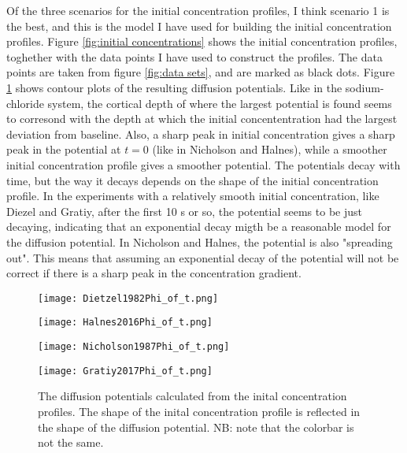 \documentclass{article}
\begin{document}
Of the three scenarios for the initial concentration profiles, I think scenario 1 is the best, and this is the model I have used for building the initial concentration profiles. Figure \ref{fig:initial concentrations} shows the initial concentration profiles, toghether with the data points I have used to construct the profiles. The data points are taken from figure \ref{fig:data sets}, and are marked as black dots. Figure \ref{fig:contours} shows contour plots of the resulting diffusion potentials. Like in the sodium-chloride system, the cortical depth of where the largest potential is found seems to corresond with the depth at which the initial concententration had the largest deviation from baseline. Also, a sharp peak in initial concentration gives a sharp peak in the potential at $t=0$ (like in Nicholson and Halnes), while a smoother initial concentration profile gives a smoother potential. The potentials decay with time, but the way it decays depends on the shape of the initial concentration profile. In the experiments with a relatively smooth initial concentration, like Diezel and Gratiy, after the first 10 s or so, the potential seems to be just decaying, indicating that an exponential decay migth be a reasonable model for the diffusion potential. In Nicholson and Halnes, the potential is also "spreading out". This means that assuming an exponential decay of the potential will not be correct if there is a sharp peak in the concentration gradient. 

\begin{figure}[!tbp]
  \centering
  \begin{minipage}[b]{0.45\textwidth}
    \texttt{[image: Dietzel1982Phi\_of\_t.png]}
  \end{minipage}
  \hfill
  \begin{minipage}[b]{0.45\textwidth}
    \texttt{[image: Halnes2016Phi\_of\_t.png]}
  \end{minipage}
    \begin{minipage}[b]{0.45\textwidth}
    \texttt{[image: Nicholson1987Phi\_of\_t.png]}
  \end{minipage}
  \hfill
  \begin{minipage}[b]{0.45\textwidth}
    \texttt{[image: Gratiy2017Phi\_of\_t.png]}
  \end{minipage}
  \caption{The diffusion potentials calculated from the inital concentration profiles. The shape of the inital concentration profile is reflected in the shape of the diffusion potential. NB: note that the colorbar is not the same.}
  \label{fig:contours}
\end{figure} 
\end{document}
